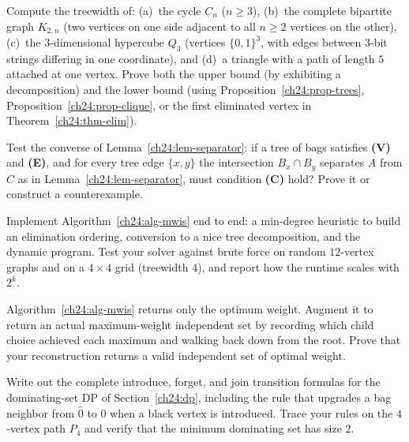 \begin{exercise}
Compute the treewidth of: (a)~the cycle $C_n$ ($n\ge 3$), (b)~the complete
bipartite graph $K_{2,n}$ (two vertices on one side adjacent to all $n\ge 2$
vertices on the other), (c)~the $3$-dimensional hypercube $Q_3$ (vertices
$\{0,1\}^3$, with edges between $3$-bit strings differing in one coordinate), and
(d)~a triangle with a path of length $5$ attached at one vertex. Prove both the
upper bound (by exhibiting a decomposition) and the lower bound (using
Proposition~\ref{ch24:prop-trees}, Proposition~\ref{ch24:prop-clique}, or the first
eliminated vertex in Theorem~\ref{ch24:thm-elim}).
\end{exercise}

\begin{exercise}
Test the converse of Lemma~\ref{ch24:lem-separator}: if a tree of bags satisfies
\textbf{(V)} and \textbf{(E)}, and for every tree edge $\{x,y\}$ the intersection
$B_x\cap B_y$ separates $A$ from $C$ as in Lemma~\ref{ch24:lem-separator}, must
condition \textbf{(C)} hold? Prove it or construct a counterexample.
\end{exercise}

\begin{exercise}
Implement Algorithm~\ref{ch24:alg-mwis} end to end: a min-degree heuristic to build
an elimination ordering, conversion to a nice tree decomposition, and the dynamic
program. Test your solver against brute force on random $12$-vertex graphs and on a
$4\times 4$ grid (treewidth $4$), and report how the runtime scales with $2^k$.
\end{exercise}

\begin{exercise}
Algorithm~\ref{ch24:alg-mwis} returns only the optimum weight. Augment it to return
an actual maximum-weight independent set by recording which child choice achieved
each maximum and walking back down from the root. Prove that your reconstruction
returns a valid independent set of optimal weight.
\end{exercise}

\begin{exercise}
Write out the complete introduce, forget, and join transition formulas for the
dominating-set DP of Section~\ref{ch24:dp}, including the rule that upgrades a bag
neighbor from $\hat 0$ to $0$ when a black vertex is introduced. Trace your rules
on the $4$-vertex path $P_4$ and verify that the minimum dominating set has size $2$.
\end{exercise}

